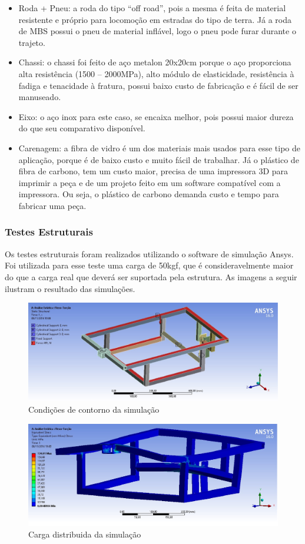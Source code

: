   \begin{itemize}
    \item Roda + Pneu: a roda do tipo “off road”, pois a mesma é feita de material resistente e próprio para locomoção em estradas do tipo de terra. Já a roda de MBS possui o pneu de material inflável, logo o pneu pode furar durante o trajeto.
    \item Chassi: o chassi foi feito de aço metalon 20x20cm porque o aço proporciona alta resistência (1500 – 2000MPa), alto módulo de elasticidade, resistência à fadiga e tenacidade à fratura, possui baixo custo de fabricação e é fácil de ser manuseado.
    \item Eixo: o aço inox para este caso, se encaixa melhor, pois possui maior dureza do que seu comparativo disponível.
    \item Carenagem: a fibra de vidro é um dos materiais mais usados para esse tipo de aplicação, porque é de baixo custo e muito fácil de trabalhar. Já o plástico de fibra de carbono, tem um custo maior, precisa de uma impressora 3D para imprimir a peça e de um projeto feito em um software compatível com a  impressora. Ou seja, o plástico de carbono demanda custo e tempo para fabricar uma peça.
  \end{itemize}

\subsubsection{Testes Estruturais}

Os testes estruturais foram realizados utilizando o software de simulação Ansys. Foi utilizada para esse teste uma carga de 50kgf, que é consideravelmente maior do que a carga real que deverá ser suportada pela estrutura. As imagens a seguir ilustram o resultado das simulações. 

\begin{figure}[!htbp]
	\centering
	\includegraphics[width=.7\textwidth]{figuras/cond_contorno.eps}
	\caption{Condições de contorno da simulação}
\end{figure}

\begin{figure}[!htbp]
	\centering
	\includegraphics[width=.7\textwidth]{figuras/carga_distribuida1.eps}
	\caption{Carga distribuida da simulação}
\end{figure}

